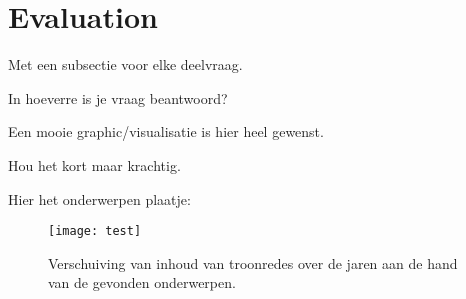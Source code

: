 \section{Evaluation}
\label{sec:eva}

Met een subsectie voor elke deelvraag.

In hoeverre is je vraag beantwoord?

Een mooie graphic/visualisatie is hier heel gewenst.

Hou het kort maar krachtig.

Hier het onderwerpen plaatje:
\begin{figure}[h]
\begin{center}
\texttt{[image: test]}
\caption{\label{fig:Onderwerpverdeling} Verschuiving van inhoud van troonredes over de jaren aan de hand van de gevonden onderwerpen.}
\end{center}
\end{figure}